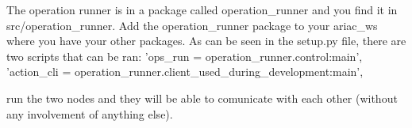 The operation runner is in a package called operation_runner and you find it in src/operation_runner.
Add the operation_runner package to your ariac_ws where you have your other packages.
As can be seen in the setup.py file, there are two scripts that can be ran: 
  'ops_run = operation_runner.control:main',
  'action_cli = operation_runner.client_used_during_development:main',

run the two nodes and they will be able to comunicate with each other (without any involvement of anything else).
